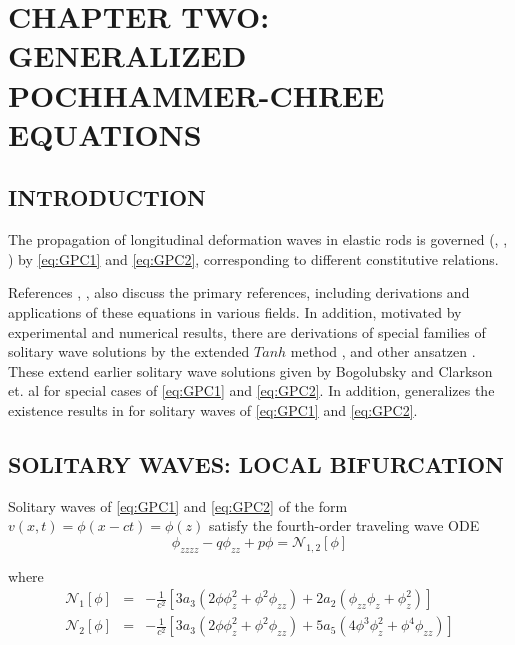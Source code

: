 \chapter{CHAPTER TWO: GENERALIZED POCHHAMMER-CHREE EQUATIONS} \label{chapter_2}

\section{INTRODUCTION}

The propagation of longitudinal deformation waves in elastic rods is governed
(\cite{LCZ}, \cite{Runz}, \cite{WM}) by 
\eqref{eq:GPC1} and \eqref{eq:GPC2},
corresponding to different constitutive relations.

References \cite{LCZ}, \cite{Runz}, \cite{WM} also discuss the primary
references, including derivations and applications of these equations in
various fields. In addition, motivated by experimental and numerical results,
there are derivations of special families of solitary wave solutions by the
extended $Tanh$ method \cite{LCZ}, and other ansatzen \cite{WM}. These extend
earlier solitary wave solutions given by Bogolubsky \cite{Bogo} and Clarkson
et. al \cite{CLVS} for special cases of \eqref{eq:GPC1} and \eqref{eq:GPC2}. In
addition, \cite{Runz} generalizes the existence results in \cite{Sax} for
solitary waves of \eqref{eq:GPC1} and \eqref{eq:GPC2}.  

\section{SOLITARY WAVES: LOCAL BIFURCATION}

Solitary waves of \eqref{eq:GPC1} and \eqref{eq:GPC2} of the form 
$v(x,t) = \phi\left(x - c t\right) = \phi\left(z\right)$
 satisfy the fourth-order traveling wave ODE
\begin{equation} \label{eq:ode} \phi_{zzzz} - q \phi_{zz} + p \phi = \mathcal{N}_{1,2}[\phi]
\end{equation}

where 
\begin{subequations}
\begin{eqnarray}
\mathcal{N}_1\left[\phi\right] &=& - \frac{1}{c^2}\left[  3 a_3 \left( 2 \phi \phi_z^2 + \phi^2 \phi_{zz} \right) + 2 a_2\left( \phi_{zz} \phi_z + \phi_z^2\right) \right] \\
\mathcal{N}_2\left[\phi\right] &=& - \frac{1}{c^2}\left[ 3 a_3 \left( 2 \phi \phi_z^2 + \phi^2 \phi_{zz}\right) + 5 a_5 \left( 4 \phi^3 \phi_z^2 + \phi^4 \phi_{zz} \right) \right]
\end{eqnarray}
\end{subequations}

